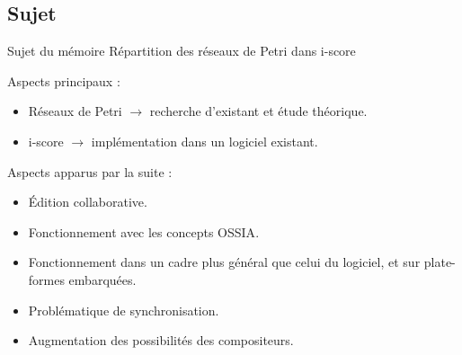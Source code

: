 \subsection{Sujet}
\begin{frame}{Sujet du mémoire}
	{\large Répartition des réseaux de Petri dans i-score}
	
	Aspects principaux : 
	\begin{itemize}
		\item Réseaux de Petri $\rightarrow$ recherche d'existant et étude théorique.
		\item i-score $\rightarrow$ implémentation dans un logiciel existant.
	\end{itemize} 
	\vspace{1em}
	Aspects apparus par la suite : 
	\begin{itemize}
		\item Édition collaborative.
		\item Fonctionnement avec les concepts {OSSIA}.
		\item Fonctionnement dans un cadre plus général que celui du logiciel, et sur plate-formes embarquées.
		\item Problématique de synchronisation.
		\item Augmentation des possibilités des compositeurs.
	\end{itemize}
\end{frame}